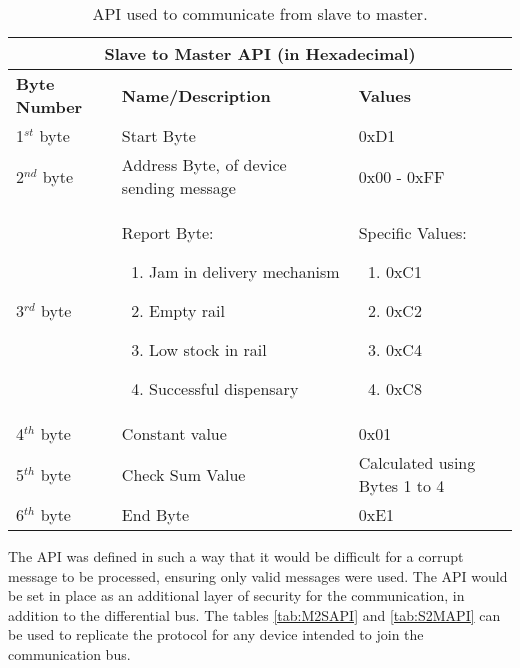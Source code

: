 \documentclass[a4paper,11pt]{article}
\numberwithin{figure}{section}
\numberwithin{table}{section}
\begin{document}
		\begin{table}[ht]
			\centering
			\begin{tabular}{| m{3cm} | m{5cm}| m{5cm} |}
			\hline
			\multicolumn{3}{|c|}{\bfseries Slave to Master API (in Hexadecimal)}\\
			\hline
			\bfseries{Byte Number}  & \bfseries{Name/Description} & \bfseries{Values} \\
			\hline
			1$^{st}$ byte & Start Byte & 0xD1\\
			\hline
			2$^{nd}$ byte & Address Byte, of device sending message & 0x00 - 0xFF\\
			\hline
			3$^{rd}$ byte & Report Byte:\begin{enumerate}[nosep]		
											\setlength{\itemsep}{0pt}
   											\setlength{\parskip}{0pt}
    										\setlength{\parsep}{0pt} 
											\item Jam in delivery mechanism
											\item Empty rail
											\item Low stock in rail
											\item Successful dispensary
										\end{enumerate} & Specific Values: \begin{enumerate}[nosep]	
																				\setlength{\itemsep}{0pt}
   																				\setlength{\parskip}{0pt}
    																			\setlength{\parsep}{0pt} 
																				\item 0xC1
																				\item 0xC2
																				\item 0xC4
																				\item 0xC8
																			\end{enumerate}\\
			\hline
			4$^{th}$ byte & Constant value & 0x01 \\
			\hline
			5$^{th}$ byte & Check Sum Value & Calculated using Bytes 1 to 4\\
			\hline
			6$^{th}$ byte & End Byte & 0xE1 \\
			\hline
			\end{tabular}
		\caption{API used to communicate from slave to master. \label{tab:S2MAPI}}
		\end{table}

The API was defined in such a way that it would be difficult for a corrupt message to be processed, ensuring only valid messages were used. The API would be set in place as an additional layer of security for the communication, in addition to the differential bus. The tables \autoref{tab:M2SAPI} and \autoref{tab:S2MAPI} can be used to replicate the protocol for any device intended to join the communication bus.
\end{document}
